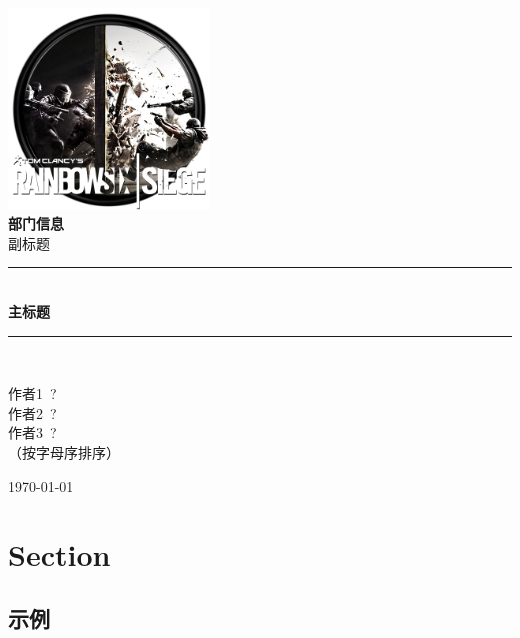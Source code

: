 \documentclass{ctexart}             %
\numberwithin{table}{section}
\numberwithin{figure}{section}
\newcommand{\HRule}{\rule{\linewidth}{0.5mm}}           %
\begin{document}
\begin{titlepage}
    \begin{center}
        \includegraphics[width=0.4\textwidth]{imgs/r6-logo.png}\\[1cm]
        \textsc{\LARGE \bfseries 部门信息}\\[1.5cm]
        \textsc{\Large 副标题}\\[0.5cm]
        \HRule \\[0.4cm]
        {\huge \bfseries 主标题}\\[0.4cm]
        \HRule \\[1.5cm]
        \begin{minipage}{0.4\textwidth}
            \begin{center} \large
                \textsc{\kaishu 作者1~?}\\
                \textsc{\kaishu 作者2~?}\\
                \textsc{\kaishu 作者3~?}\\
                \textsc{\small\kaishu （按字母序排序）}
            \end{center}
        \end{minipage}
        \vfill
        {\large \today}
    \end{center}
\end{titlepage}

\doublespacing
\begin{abstract}
    \zhlipsum
\end{abstract}

\clearpage
\tableofcontents
\clearpage

\section{Section}
\zhlipsum[2]
\subsection{示例}
\zhlipsum[3]
\end{document}
